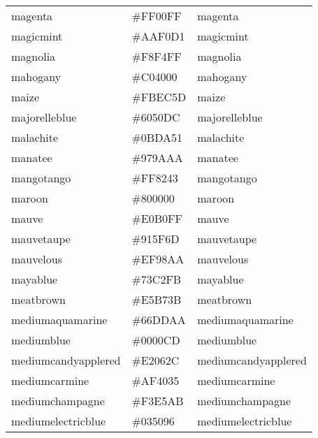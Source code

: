 \documentclass[
]{article}
\begin{document}
\begin{longtable}[]{@{}lll@{}}
magenta & \colorbox[rgb]{1.0,0.0,1.0}{\#FF00FF} &
\textcolor[rgb]{1.0,0.0,1.0}{magenta               }\tabularnewline
magicmint & \colorbox[rgb]{0.67,0.94,0.82}{\#AAF0D1} &
\textcolor[rgb]{0.67,0.94,0.82}{magicmint             }\tabularnewline
magnolia & \colorbox[rgb]{0.97,0.96,1.0}{\#F8F4FF} &
\textcolor[rgb]{0.97,0.96,1.0}{magnolia              }\tabularnewline
mahogany & \colorbox[rgb]{0.75,0.25,0.0}{\#C04000} &
\textcolor[rgb]{0.75,0.25,0.0}{mahogany              }\tabularnewline
maize & \colorbox[rgb]{0.98,0.93,0.36}{\#FBEC5D} &
\textcolor[rgb]{0.98,0.93,0.37}{maize                 }\tabularnewline
majorelleblue & \colorbox[rgb]{0.38,0.31,0.86}{\#6050DC} &
\textcolor[rgb]{0.38,0.31,0.86}{majorelleblue         }\tabularnewline
malachite & \colorbox[rgb]{0.04,0.85,0.32}{\#0BDA51} &
\textcolor[rgb]{0.04,0.85,0.32}{malachite             }\tabularnewline
manatee & \colorbox[rgb]{0.59,0.6,0.67}{\#979AAA} &
\textcolor[rgb]{0.59,0.6,0.67}{manatee               }\tabularnewline
mangotango & \colorbox[rgb]{1.0,0.51,0.26}{\#FF8243} &
\textcolor[rgb]{1.0,0.51,0.26}{mangotango            }\tabularnewline
maroon & \colorbox[rgb]{0.5,0.0,0.0}{\#800000} &
\textcolor[rgb]{0.5,0.0,0.0}{maroon                }\tabularnewline
mauve & \colorbox[rgb]{0.88,0.69,1.0}{\#E0B0FF} &
\textcolor[rgb]{0.88,0.69,1.0}{mauve                 }\tabularnewline
mauvetaupe & \colorbox[rgb]{0.57,0.37,0.43}{\#915F6D} &
\textcolor[rgb]{0.57,0.37,0.43}{mauvetaupe            }\tabularnewline
mauvelous & \colorbox[rgb]{0.94,0.6,0.67}{\#EF98AA} &
\textcolor[rgb]{0.94,0.6,0.67}{mauvelous             }\tabularnewline
mayablue & \colorbox[rgb]{0.45,0.76,0.98}{\#73C2FB} &
\textcolor[rgb]{0.45,0.76,0.98}{mayablue              }\tabularnewline
meatbrown & \colorbox[rgb]{0.9,0.72,0.23}{\#E5B73B} &
\textcolor[rgb]{0.9,0.72,0.23}{meatbrown             }\tabularnewline
mediumaquamarine & \colorbox[rgb]{0.4,0.8,0.67}{\#66DDAA} &
\textcolor[rgb]{0.4,0.8,0.67}{mediumaquamarine      }\tabularnewline
mediumblue & \colorbox[rgb]{0.0,0.0,0.8}{\#0000CD} &
\textcolor[rgb]{0.0,0.0,0.8}{mediumblue            }\tabularnewline
mediumcandyapplered & \colorbox[rgb]{0.89,0.02,0.17}{\#E2062C} &
\textcolor[rgb]{0.89,0.02,0.17}{mediumcandyapplered   }\tabularnewline
mediumcarmine & \colorbox[rgb]{0.69,0.25,0.21}{\#AF4035} &
\textcolor[rgb]{0.69,0.25,0.21}{mediumcarmine         }\tabularnewline
mediumchampagne & \colorbox[rgb]{0.95,0.9,0.67}{\#F3E5AB} &
\textcolor[rgb]{0.95,0.9,0.67}{mediumchampagne       }\tabularnewline
mediumelectricblue & \colorbox[rgb]{0.01,0.31,0.59}{\#035096} &
\textcolor[rgb]{0.01,0.31,0.59}{mediumelectricblue    }\tabularnewline

\end{longtable}
\end{document}
